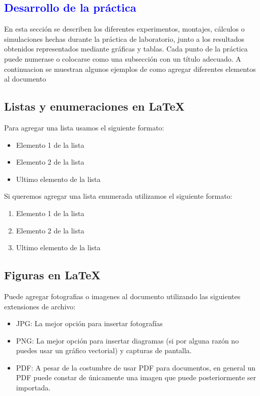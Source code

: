\textcolor{blue}{\section{Desarrollo de la práctica}}
En esta sección se describen los diferentes experimentos, montajes, cálculos o simulaciones hechas durante la práctica de laboratorio, junto a los resultados obtenidos representados mediante gráficas y tablas. Cada punto de la práctica puede numerase o colocarse como una subsección con un título adecuado.
A continuacion se muestran algunos ejemplos de como agregar diferentes elementos al documento

\subsection{Listas y enumeraciones en LaTeX}

Para agregar una lista usamos el siguiente formato:
\begin{itemize}
    \item Elemento 1 de la lista
    \item Elemento 2 de la lista
    \item Ultimo elemento de la lista
\end{itemize}

Si queremos agregar una lista enumerada utilizamos el siguiente formato:
\begin{enumerate}
    \item Elemento 1 de la lista
    \item Elemento 2 de la lista
    \item Ultimo elemento de la lista
\end{enumerate}

\subsection{Figuras en LaTeX}
Puede agregar fotografias o imagenes al documento utilizando las siguientes extensiones de archivo:

\begin{itemize}
    \item JPG: La mejor opción para insertar fotografías
    \item PNG: La mejor opción para insertar diagramas (si por alguna razón no puedes usar un gráfico vectorial) y capturas de pantalla.
    \item PDF: A pesar de la costumbre de usar PDF para documentos, en general un PDF puede constar de únicamente una imagen que puede posteriormente ser importada.
\end{itemize}

